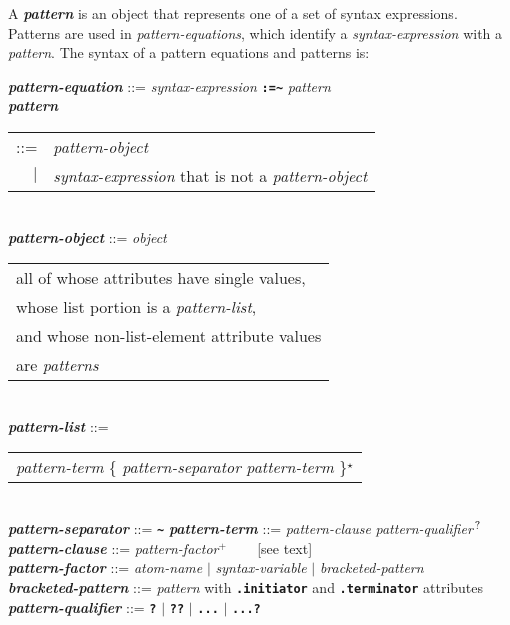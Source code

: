 \documentclass[12pt]{article}
\newcommand{\TT}[1]{{\tt \bfseries #1}}
\newcommand{\ttkey}[1]{{\tt \bfseries #1}}
\newcommand{\emkey}[1]{{\em \bfseries #1}}
\newcommand{\STAR}{{\Large $^\star$}}
\newcommand{\PLUS}[1][]{{$^{+#1}$}}
\newcommand{\QMARK}{{$^{\,\mbox{\footnotesize ?}}$}}
\newcommand{\TILDE}{\textasciitilde}
\newenvironment{indpar}[1][0.3in]%
	{\begin{list}{}%
		     {\setlength{\itemsep}{0in}%
		      \setlength{\topsep}{0in}%
		      \setlength{\parsep}{1ex}%
		      \setlength{\labelwidth}{#1}%
		      \setlength{\leftmargin}{#1}%
		      \addtolength{\leftmargin}{\labelsep}}%
	 \item}%
	{\end{list}}
\begin{document}
A \emkey{pattern} is an object that represents one of
a set of syntax expressions.  Patterns are used in
{\em pattern-equations}, which identify a {\em syntax-expression} with
a {\em pattern}.  The syntax of a pattern equations and patterns is:

\begin{indpar}
\emkey{pattern-equation} ::= {\em syntax-expression} \ttkey{:=\TILDE}
			    {\em pattern}
\\[1ex]
\emkey{pattern} \begin{tabular}[t]{@{}rl}
                ::= & {\em pattern-object} \\
		$|$ & {\em syntax-expression}
		      that is not a {\em pattern-object}
		\end{tabular}
\\[1ex]
\emkey{pattern-object} ::= {\em object}
		           \begin{tabular}[t]{l}
			   all of whose attributes have single values, \\
		           whose list portion is a {\em pattern-list}, \\
		           and whose non-list-element attribute values \\
		           are {\em patterns} \\
		           \end{tabular}
\\[1ex]
\emkey{pattern-list} ::=
    \begin{tabular}[t]{l}
    {\em pattern-term}
        \{ {\em pattern-separator} {\em pattern-term} \}\STAR{} \\
    \end{tabular}
\label{PATTERN}
    \\[1ex]
\emkey{pattern-separator} ::= \ttkey{\TILDE}
\emkey{pattern-term} ::= {\em pattern-clause} {\em pattern-qualifier}\QMARK{}
	\\[1ex]
\emkey{pattern-clause} ::= {\em pattern-factor}\PLUS{} ~~~ [see text]
	\\[1ex]
\emkey{pattern-factor} ::= {\em atom-name}
		       $|$ {\em syntax-variable}
		       $|$ {\em bracketed-pattern}
       \\[1ex]
\emkey{bracketed-pattern} ::= {\em pattern} with \TT{.initiator} and
                              \TT{.terminator} attributes
       \\[1ex]
\emkey{pattern-qualifier} ::=
		           \ttkey{?}
		       $|$ \ttkey{??}
		       $|$ \ttkey{...}
		       $|$ \ttkey{...?}
\end{indpar}
\end{document}
